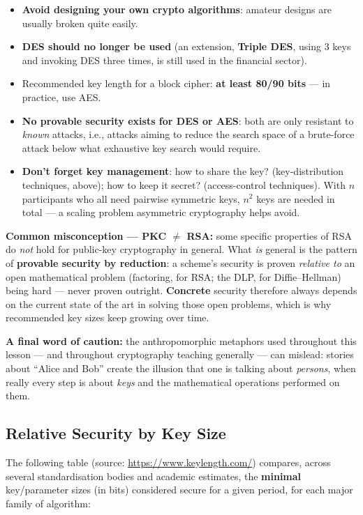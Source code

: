 \documentclass[12pt, a4paper]{article}
\begin{document}
\begin{itemize}
    \item \textbf{Avoid designing your own crypto algorithms}: amateur designs are usually broken quite easily.
    \item \textbf{DES should no longer be used} (an extension, \textbf{Triple DES}, using 3 keys and invoking DES three times, is still used in the financial sector).
    \item Recommended key length for a block cipher: \textbf{at least 80/90 bits} --- in practice, use AES.
    \item \textbf{No provable security exists for DES or AES}: both are only resistant to \emph{known} attacks, i.e., attacks aiming to reduce the search space of a brute-force attack below what exhaustive key search would require.
    \item \textbf{Don't forget key management}: how to share the key? (key-distribution techniques, above); how to keep it secret? (access-control techniques). With $n$ participants who all need pairwise symmetric keys, $n^2$ keys are needed in total --- a scaling problem asymmetric cryptography helps avoid.
\end{itemize}

\textcolor{ForestGreen!60!black}{\textbf{Common misconception --- PKC $\neq$ RSA:}} some specific properties of RSA do \emph{not} hold for public-key cryptography in general. What \emph{is} general is the pattern of \textbf{provable security by reduction}: a scheme's security is proven \emph{relative to} an open mathematical problem (factoring, for RSA; the DLP, for Diffie--Hellman) being hard --- never proven outright. \textbf{Concrete} security therefore always depends on the current state of the art in solving those open problems, which is why recommended key sizes keep growing over time.

\textcolor{blue!50!black}{\textbf{A final word of caution:}} the anthropomorphic metaphors used throughout this lesson --- and throughout cryptography teaching generally --- can mislead: stories about ``Alice and Bob'' create the illusion that one is talking about \emph{persons}, when really every step is about \emph{keys} and the mathematical operations performed on them.

\subsection{Relative Security by Key Size}

The following table (source: \url{https://www.keylength.com/}) compares, across several standardisation bodies and academic estimates, the \textbf{minimal} key/parameter sizes (in bits) considered secure for a given period, for each major family of algorithm:
\end{document}
